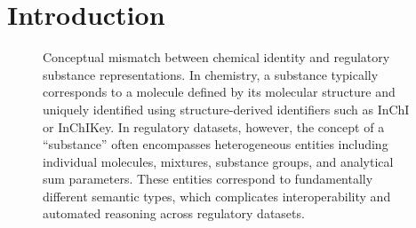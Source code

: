 \section{Introduction}
\label{sec:introduction}


\begin{figure}[H]
	\centering                                                                                                                                                                                                                                                                                                                                                                                                           
	\caption{Conceptual mismatch between chemical identity and regulatory substance representations.
		In chemistry, a substance typically corresponds to a molecule defined by its molecular structure and uniquely identified using structure-derived identifiers such as InChI or InChIKey. In regulatory datasets, however, the concept of a “substance” often encompasses heterogeneous entities including individual molecules, mixtures, substance groups, and analytical sum parameters. These entities correspond to fundamentally different semantic types, which complicates interoperability and automated reasoning across regulatory datasets.} \label{fig:mismatch}                                                                                                                                                                                                                                                                                                                                                                  
\end{figure}   



